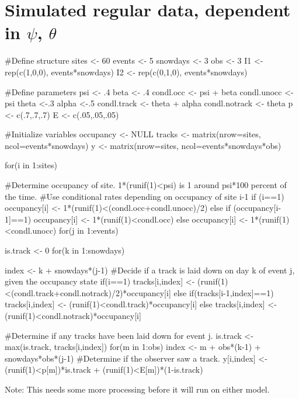 \documentclass[12pt]{article}
\begin{document}
\section{Simulated regular data, dependent in $\psi$, $\theta$}
\scriptsize
\begin{verbatimtab}
#Define structure
sites <- 60
events <- 5
snowdays <- 3
obs <- 3
I1 <- rep(c(1,0,0), events*snowdays)
I2 <- rep(c(0,1,0), events*snowdays)

#Define parameters
psi <- .4
beta <- .4
condl.occ <- psi + beta
condl.unocc <- psi
theta <-.3
alpha <-.5
condl.track <- theta + alpha
condl.notrack <- theta
p <- c(.7,.7,.7)
E <- c(.05,.05,.05)

#Initialize variables
occupancy <- NULL
tracks <- matrix(nrow=sites, ncol=events*snowdays)
y <- matrix(nrow=sites, ncol=events*snowdays*obs)

for(i in 1:sites) {
	#Determine occupancy of site. 1*(runif(1)<psi) is 1 around psi*100 percent of the time.
	#Use conditional rates depending on occupancy of site i-1
	if (i==1) 
		{occupancy[i] <- 1*(runif(1)<(condl.occ+condl.unocc)/2)}	
	else if (occupancy[i-1]==1) 
		{occupancy[i] <- 1*(runif(1)<condl.occ)}
	else 
		{occupancy[i] <- 1*(runif(1)<condl.unocc)}
	for(j in 1:events) {
		is.track <- 0
		for(k in 1:snowdays) {
			index <- k + snowdays*(j-1)
			#Decide if a track is laid down on day k of event j, given the occupancy state
			if(i==1) {
				tracks[i,index] <- (runif(1)<(condl.track+condl.notrack)/2)*occupancy[i]
			}else if(tracks[i-1,index]==1) 
				{tracks[i,index] <- (runif(1)<condl.track)*occupancy[i]
			}else 
				{tracks[i,index] <- (runif(1)<condl.notrack)*occupancy[i]}

			#Determine if any tracks have been laid down for event j.
			is.track <- max(is.track, tracks[i,index])
			for(m in 1:obs) {
				index <- m + obs*(k-1) + snowdays*obs*(j-1)
				#Determine if the observer saw a track.
				y[i,index] <- (runif(1)<p[m])*is.track + (runif(1)<E[m])*(1-is.track)
			}
		}
	}
}
\end{verbatimtab}
Note: This needs some more processing before it will run on either model.
\end{document}

